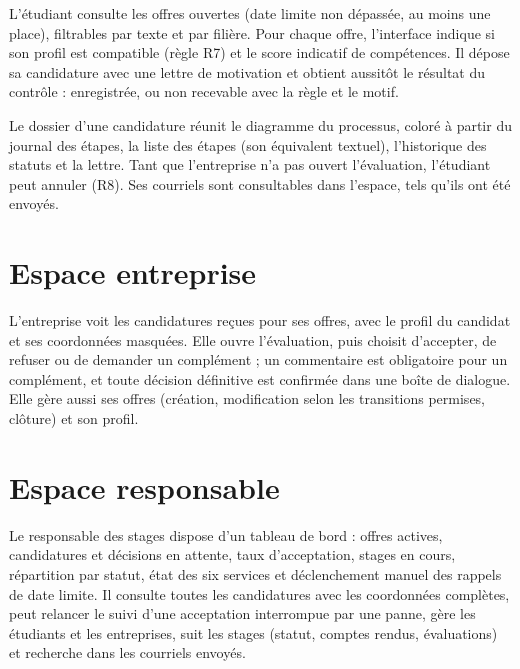 L'étudiant consulte les offres ouvertes (date limite non dépassée, au moins une place), filtrables par texte et par filière. Pour chaque offre, l'interface indique si son profil est compatible (règle R7) et le score indicatif de compétences. Il dépose sa candidature avec une lettre de motivation et obtient aussitôt le résultat du contrôle : enregistrée, ou non recevable avec la règle et le motif.


Le dossier d'une candidature réunit le diagramme du processus, coloré à partir du journal des étapes, la liste des étapes (son équivalent textuel), l'historique des statuts et la lettre. Tant que l'entreprise n'a pas ouvert l'évaluation, l'étudiant peut annuler (R8). Ses courriels sont consultables dans l'espace, tels qu'ils ont été envoyés.


\section{Espace entreprise}

L'entreprise voit les candidatures reçues pour ses offres, avec le profil du candidat et ses coordonnées masquées. Elle ouvre l'évaluation, puis choisit d'accepter, de refuser ou de demander un complément ; un commentaire est obligatoire pour un complément, et toute décision définitive est confirmée dans une boîte de dialogue. Elle gère aussi ses offres (création, modification selon les transitions permises, clôture) et son profil.


\section{Espace responsable}

Le responsable des stages dispose d'un tableau de bord : offres actives, candidatures et décisions en attente, taux d'acceptation, stages en cours, répartition par statut, état des six services et déclenchement manuel des rappels de date limite. Il consulte toutes les candidatures avec les coordonnées complètes, peut relancer le suivi d'une acceptation interrompue par une panne, gère les étudiants et les entreprises, suit les stages (statut, comptes rendus, évaluations) et recherche dans les courriels envoyés.

